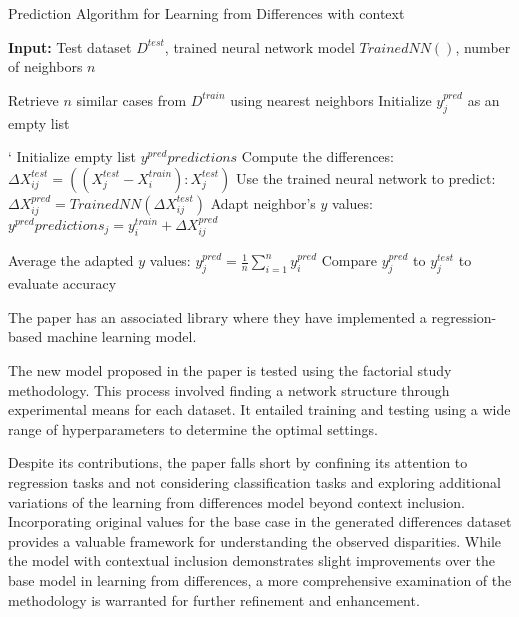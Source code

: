 \documentclass[a4paper, 12pt]{report}
\begin{document}
\begin{algorithm}
	\caption{Prediction Algorithm for Learning from Differences with context}
	\label{alg:learning_from_differences_varient_predict_alg4}

	\textbf{Input:} Test dataset $D^{test}$, trained neural network model $Trained NN()$, number of neighbors $n$
	\begin{algorithmic}[h]
			\State Retrieve $n$ similar cases from $D^{train}$ using nearest neighbors
			\State Initialize $y^{pred}_j$ as an empty list

			`	\State Initialize empty list $y^{pred}predictions$
				\State Compute the differences: $\Delta X^{test}_{ij} = ((X^{test}_j - X^{train}_i):X^{test}_j)$
				\State Use the trained neural network to predict: ${\Delta X^{pred}_{ij}} = Trained NN(\Delta X^{test}_{ij})$
				\State Adapt neighbor's $y$ values: $y^{pred}predictions_j = y^{train}_i + \Delta X^{pred}_{ij}$
			\EndFor
			
			\State Average the adapted $y$ values: $y^{pred}_j = \frac{1}{n} \sum_{i=1}^{n} y^{pred}_i$
			\State Compare $y^{pred}_j$ to $y^{test}_j$ to evaluate accuracy
		\EndFor

	\end{algorithmic}
\end{algorithm}

The paper \cite{learningFromDifferences2022} has an associated library where they have implemented a regression-based machine learning model.

The new model proposed in the paper is tested using the factorial study methodology.
This process involved finding a network structure through experimental means for each dataset.
It entailed training and testing using a wide range of hyperparameters to determine the optimal settings.

Despite its contributions, the paper falls short by confining its attention to regression tasks and not considering classification tasks and exploring additional
variations of the learning from differences model beyond context inclusion.
Incorporating original values for the base case in the generated differences dataset provides a valuable framework for understanding the observed disparities.
While the model with contextual inclusion demonstrates slight improvements over the base model in learning from differences, a more comprehensive examination of the methodology is warranted for
further refinement and enhancement.
\end{document}
